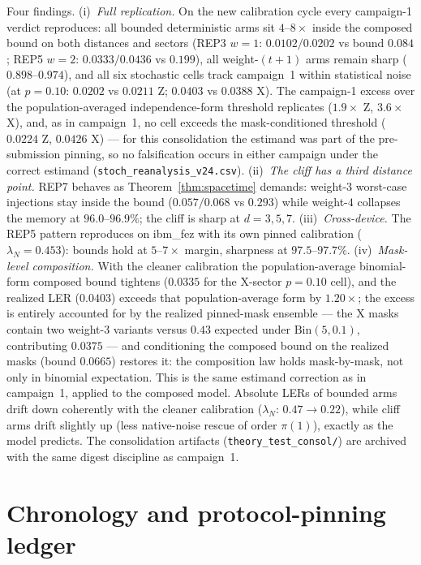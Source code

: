 \documentclass[11pt,a4paper]{article}
\begin{document}
Four findings. (i)~\emph{Full replication.} On the new calibration cycle
every campaign-1 verdict reproduces: all bounded deterministic arms sit
$4$--$8\times$ inside the composed bound on both distances and sectors
(REP3 $w{=}1$: $0.0102/0.0202$ vs bound $0.084$; REP5 $w{=}2$:
$0.0333/0.0436$ vs $0.199$), all weight-$(t{+}1)$ arms remain sharp
($0.898$--$0.974$), and all six stochastic cells track campaign~1 within
statistical noise (at $p{=}0.10$: $0.0202$ vs $0.0211$ Z; $0.0403$ vs
$0.0388$ X). The campaign-1 excess over the population-averaged
independence-form threshold replicates ($1.9\times$ Z, $3.6\times$ X),
and, as in campaign~1, no cell exceeds the mask-conditioned threshold
($0.0224$ Z, $0.0426$ X) --- for this consolidation the estimand was
part of the pre-submission pinning, so no falsification
occurs in either campaign under the correct estimand
(\texttt{stoch\_reanalysis\_v24.csv}).
(ii)~\emph{The cliff has a third distance point.} REP7 behaves as
Theorem~\ref{thm:spacetime} demands: weight-$3$ worst-case injections
stay inside the bound ($0.057/0.068$ vs $0.293$) while weight-$4$
collapses the memory at $96.0$--$96.9\%$; the cliff is sharp at
$d{=}3,5,7$. (iii)~\emph{Cross-device.} The REP5 pattern reproduces on
ibm\_fez with its own pinned calibration ($\lambda_N{=}0.453$): bounds
hold at $5$--$7\times$ margin, sharpness at $97.5$--$97.7\%$.
(iv)~\emph{Mask-level composition.} With the cleaner calibration the
population-average binomial-form composed bound tightens ($0.0335$ for
the X-sector $p{=}0.10$ cell), and the realized LER ($0.0403$) exceeds
that population-average form by $1.20\times$; the excess is entirely
accounted for by the realized pinned-mask ensemble --- the X masks
contain two weight-3 variants versus $0.43$ expected under
$\mathrm{Bin}(5,0.1)$, contributing $0.0375$ --- and conditioning the
composed bound on the realized masks (bound $0.0665$) restores it: the
composition law holds mask-by-mask, not only in binomial expectation.
This is the same estimand correction as in campaign~1, applied to the
composed model. Absolute LERs of bounded
arms drift down coherently with the cleaner calibration
($\lambda_N$: $0.47{\to}0.22$), while cliff arms drift slightly up (less
native-noise rescue of order $\pi(1)$), exactly as the model predicts.
The consolidation artifacts (\texttt{theory\_test\_consol/}) are archived
with the same digest discipline as campaign~1.

\section{Chronology and protocol-pinning ledger}\label{app:chronology}
\end{document}
